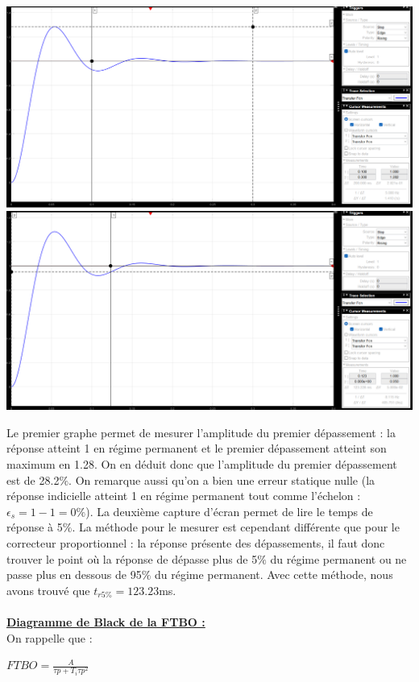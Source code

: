 \documentclass[12pt]{article}
\begin{document}
\begin{center}
    \includegraphics[width = 19 cm]{TP2 Simulink/Syst_1/depassement_syst1_Ti=tau.png}
    \includegraphics[width = 19 cm]{TP2 Simulink/Syst_1/tr5prct_syst_1_Ti=tau.png}
\end{center}
\normalsize Le premier graphe permet de mesurer l'amplitude du premier dépassement : la réponse atteint 1 en régime permanent et le premier dépassement atteint son maximum en 1.28. On en déduit donc que l'amplitude du premier dépassement est de 28.2$\%$.
On remarque aussi qu'on a bien une erreur statique nulle (la réponse indicielle atteint 1 en régime permanent tout comme l'échelon : $\epsilon_s = 1-1 = 0\%$).
La deuxième capture d'écran permet de lire le temps de réponse à 5$\%$. La méthode pour le mesurer est cependant différente que pour le correcteur proportionnel : la réponse présente des dépassements, il faut donc trouver le point où la réponse de dépasse plus de 5$\%$ du régime permanent ou ne passe plus en dessous de 95$\%$ du régime permanent.
Avec cette méthode, nous avons trouvé que $t_{r5\%} = 123.23$ms.
\\\\\underline{\bf Diagramme de Black de la FTBO :}
\\On rappelle que :
\begin{center}
    \large$FTBO = \frac{A}{\tau p + T_i\tau p^2}$
\end{center}
\end{document}
